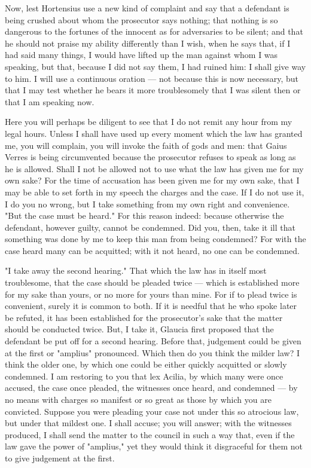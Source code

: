  Now, lest Hortensius use a new kind of complaint and say that a defendant is being crushed about whom the prosecutor says nothing; that nothing is so dangerous to the fortunes of the innocent as for adversaries to be silent; and that he should not praise my ability differently than I wish, when he says that, if I had said many things, I would have lifted up the man against whom I was speaking, but that, because I did not say them, I had ruined him: I shall give way to him. I will use a continuous oration --- not because this is now necessary, but that I may test whether he bears it more troublesomely that I was silent then or that I am speaking now.

 Here you will perhaps be diligent to see that I do not remit any hour from my legal hours. Unless I shall have used up every moment which the law has granted me, you will complain, you will invoke the faith of gods and men: that Gaius Verres is being circumvented because the prosecutor refuses to speak as long as he is allowed. Shall I not be allowed not to use what the law has given me for my own sake? For the time of accusation has been given me for my own sake, that I may be able to set forth in my speech the charges and the case. If I do not use it, I do you no wrong, but I take something from my own right and convenience. "But the case must be heard." For this reason indeed: because otherwise the defendant, however guilty, cannot be condemned. Did you, then, take it ill that something was done by me to keep this man from being condemned? For with the case heard many can be acquitted; with it not heard, no one can be condemned.

 "I take away the second hearing." That which the law has in itself most troublesome, that the case should be pleaded twice --- which is established more for my sake than yours, or no more for yours than mine. For if to plead twice is convenient, surely it is common to both. If it is needful that he who spoke later be refuted, it has been established for the prosecutor's sake that the matter should be conducted twice. But, I take it, Glaucia first proposed that the defendant be put off for a second hearing. Before that, judgement could be given at the first or "amplius" pronounced. Which then do you think the milder law? I think the older one, by which one could be either quickly acquitted or slowly condemned. I am restoring to you that lex Acilia, by which many were once accused, the case once pleaded, the witnesses once heard, and condemned --- by no means with charges so manifest or so great as those by which you are convicted. Suppose you were pleading your case not under this so atrocious law, but under that mildest one. I shall accuse; you will answer; with the witnesses produced, I shall send the matter to the council in such a way that, even if the law gave the power of "amplius," yet they would think it disgraceful for them not to give judgement at the first.

